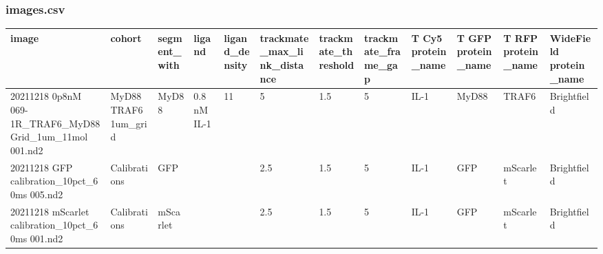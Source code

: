 \subsubsection*{images.csv}
\begin{tabular}{|l|l|l|l|l|l|l|l|l|l|l|l|}
    \hline
    image & cohort & segment\_with & ligand & ligand\_density & trackmate\_max\_link\_distance & trackmate\_threshold & trackmate\_frame\_gap & T Cy5 protein\_name & T GFP protein\_name & T RFP protein\_name & WideField protein\_name \\
    \hline
    20211218 0p8nM 069-1R\_TRAF6\_MyD88 Grid\_1um\_11mol 001.nd2 & MyD88 TRAF6 1um\_grid & MyD88 & 0.8 nM IL-1 & 11 & 5 & 1.5 & 5 & IL-1 & MyD88 & TRAF6 & Brightfield \\
    20211218 GFP calibration\_10pct\_60ms 005.nd2 & Calibrations & GFP &  &  & 2.5 & 1.5 & 5 & IL-1 & GFP & mScarlet & Brightfield \\
    20211218 mScarlet calibration\_10pct\_60ms 001.nd2 & Calibrations & mScarlet &  &  & 2.5 & 1.5 & 5 & IL-1 & GFP & mScarlet & Brightfield \\
    \hline
\end{tabular}

